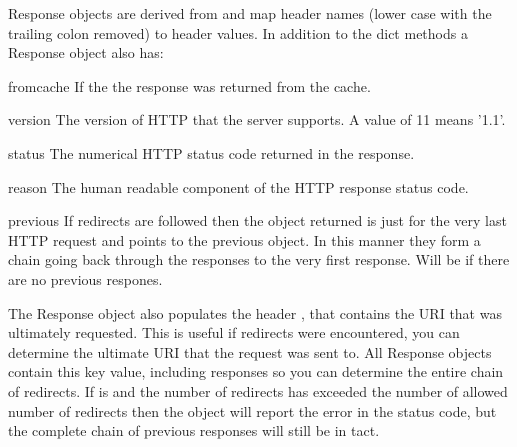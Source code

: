 Response objects are derived from  and map
header names (lower case with the trailing colon removed)
to header values. In addition to the dict methods
a Response object also has:

\begin{memberdesc}[Response]{fromcache}
If  the the response was returned from the cache.
\end{memberdesc}

\begin{memberdesc}[Response]{version}
The version of HTTP that the server supports. A value
of 11 means '1.1'.
\end{memberdesc}

\begin{memberdesc}[Response]{status}
The numerical HTTP status code returned in the response.
\end{memberdesc}

\begin{memberdesc}[Response]{reason}
The human readable component of the HTTP response status code.
\end{memberdesc}

\begin{memberdesc}[Response]{previous}
If redirects are followed then the  object returned
is just for the very last HTTP request and  points to
the previous  object. In this manner they form a chain
going back through the responses to the very first response.
Will be  if there are no previous respones.
\end{memberdesc}

The Response object also populates the header , that
contains the URI that was ultimately requested. This is useful if
redirects were encountered, you can determine the ultimate URI that
the request was sent to. All Response objects contain this key value,
including  responses so you can determine the entire
chain of redirects. If  is 
and the number of redirects has exceeded the number of allowed number 
of redirects then the  object will report the error
in the status code, but the complete chain of previous responses will
still be in tact.



